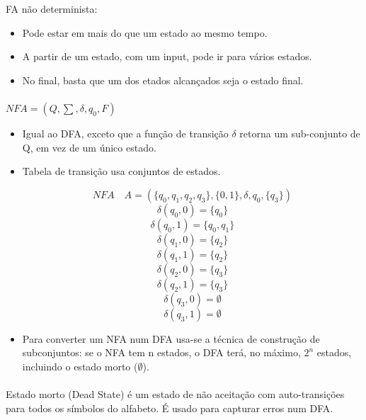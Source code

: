 \documentclass[../resumosTCOM.tex]{subfiles}
\begin{document}
 

FA não determinista:
\begin{itemize}
    \item Pode estar em mais do que um estado ao mesmo tempo.
    \item A partir de um estado, com um input, pode ir para vários estados.
    \item No final, basta que um dos etados alcançados seja o estado final.
\end{itemize}

\paragraph{}

\(NFA = (Q, \sum, \delta, q_0, F)\)
\begin{itemize}
    \item Igual ao DFA, exceto que a função de transição \(\delta\) retorna um sub-conjunto de Q, em vez de um único estado.
    \item Tabela de transição usa conjuntos de estados.
        \begin{figure}[H]
            \centering
            \qquad
            \label{fig:nfa}%
        \end{figure}
        \[NFA \quad A = (\{q_0, q_1, q_2, q_3\}, \{0, 1\}, \delta, q_0, \{q_3\})\]
        \[\delta(q_0, 0) = \{q_0\}\]
        \[\delta(q_0, 1) = \{q_0, q_1\}\]
        \[\delta(q_1, 0) = \{q_2\}\]
        \[\delta(q_1, 1) = \{q_2\}\]
        \[\delta(q_2, 0) = \{q_3\}\]
        \[\delta(q_2, 1) = \{q_3\}\]
        \[\delta(q_3, 0) = \emptyset\]
        \[\delta(q_3, 1) = \emptyset\]
    \item Para converter um NFA num DFA usa-se a técnica de construção de subconjuntos: se o NFA tem n estados, o DFA terá, no máximo, \(2^n\) estados, incluindo o estado morto (\(\emptyset\)).
\end{itemize}

\paragraph{}

Estado morto (Dead State) é um estado de não aceitação com auto-transições para todos os símbolos do alfabeto. É usado para capturar erros num DFA.
\end{document}
